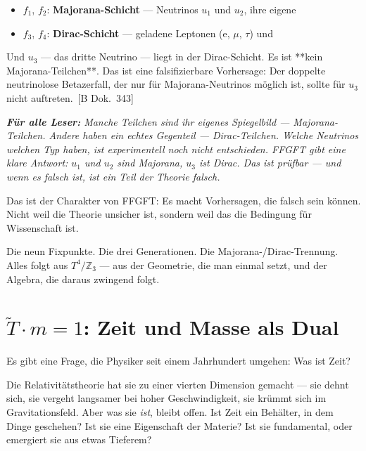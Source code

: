 \documentclass[11pt,oneside]{book}
\newcommand{\status}[1]{\penalty10000\,{\scriptsize\textcolor{gray!60}{[#1]}}}
\newenvironment{laierspur}{%
  \par\vspace{4pt}%
  \noindent\small\itshape\color{blue!60!black}%
  \textbf{Für alle Leser:}\enspace\ignorespaces}{%
  \par\vspace{4pt}\normalsize\normalfont\normalcolor}
\begin{document}
\begin{itemize}
  \item $f_1$, $f_2$: \textbf{Majorana-Schicht} — Neutrinos $
u_1$ und $
u_2$, ihre eigene
\end{itemize}

\begin{itemize}
  \item $f_3$, $f_4$: \textbf{Dirac-Schicht} — geladene Leptonen (e, $\mu$, $\tau$) und
\end{itemize}

Und $
u_3$ — das dritte Neutrino — liegt in der Dirac-Schicht. Es ist **kein
Majorana-Teilchen**. Das ist eine falsifizierbare Vorhersage: Der doppelte
neutrinolose Betazerfall, der nur für Majorana-Neutrinos möglich ist,
sollte für $
u_3$ nicht auftreten. \status{B Dok.~343}


\begin{laierspur}
Manche Teilchen sind ihr eigenes Spiegelbild — Majorana-
Teilchen. Andere haben ein echtes Gegenteil — Dirac-Teilchen. Welche
Neutrinos welchen Typ haben, ist experimentell noch nicht entschieden.
FFGFT gibt eine klare Antwort: $
u_1$ und $
u_2$ sind Majorana, $
u_3$ ist Dirac.
Das ist prüfbar — und wenn es falsch ist, ist ein Teil der Theorie falsch.
\end{laierspur}

Das ist der Charakter von FFGFT: Es macht Vorhersagen, die falsch sein
können. Nicht weil die Theorie unsicher ist, sondern weil das die
Bedingung für Wissenschaft ist.


Die neun Fixpunkte. Die drei Generationen. Die Majorana-/Dirac-Trennung.
Alles folgt aus $T^4/\mathbb{Z}_3$ — aus der Geometrie, die man einmal setzt, und
der Algebra, die daraus zwingend folgt.








\chapter{\texorpdfstring{$\tilde{T}\cdot m = 1$: Zeit und Masse als Dual}{T$\cdot$m = 1: Zeit und Masse als Dual}}

Es gibt eine Frage, die Physiker seit einem Jahrhundert umgehen: Was ist Zeit?


Die Relativitätstheorie hat sie zu einer vierten Dimension gemacht — sie
dehnt sich, sie vergeht langsamer bei hoher Geschwindigkeit, sie krümmt
sich im Gravitationsfeld. Aber was sie \textit{ist}, bleibt offen. Ist Zeit ein
Behälter, in dem Dinge geschehen? Ist sie eine Eigenschaft der Materie?
Ist sie fundamental, oder emergiert sie aus etwas Tieferem?
\end{document}
